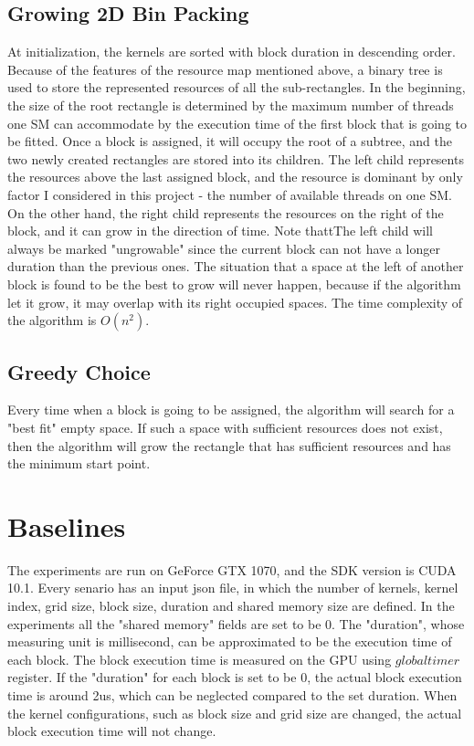\documentclass[12pt,journal,compsoc]{IEEEtran}
\begin{document}
\subsection{Growing 2D Bin Packing}
At initialization, the kernels are sorted with block duration in descending order. Because of the features of the resource map mentioned above, a binary tree is used to store the represented resources of all the sub-rectangles. In the beginning, the size of the root rectangle is determined by the maximum number of threads one SM can accommodate by the execution time of the first block that is going to be fitted. Once a block is assigned, it will occupy the root of a subtree, and the two newly created rectangles are stored into its children. The left child represents the resources above the last assigned block, and the resource is dominant by only factor I considered in this project - the number of available threads on one SM. On the other hand, the right child represents the resources on the right of the block, and it can grow in the direction of time. Note thattThe left child will always be marked "ungrowable" since the current block can not have a longer duration than the previous ones. The situation that a space at the left of another block is found to be the best to grow will never happen, because if the algorithm let it grow, it may overlap with its right occupied spaces. The time complexity of the algorithm is $O(n^2)$.
\subsection{Greedy Choice}
Every time when a block is going to be assigned, the algorithm will search for a "best fit" empty space. If such a space with sufficient resources does not exist, then the algorithm will grow the rectangle that has sufficient resources and has the minimum start point.


\section{Baselines}
The experiments are run on GeForce GTX 1070, and the SDK version is CUDA 10.1. Every senario has an input json file, in which the number of kernels, kernel index, grid size, block size, duration and shared memory size are defined. In the experiments all the "shared memory" fields are set to be 0. The "duration", whose measuring unit is millisecond, can be approximated to be the execution time of each block. The block execution time is measured on the GPU using $globaltimer$ register. If the "duration" for each block is set to be 0, the actual block execution time is around 2us, which can be neglected compared to the set duration. When the kernel configurations, such as block size and grid size are changed, the actual block execution time will not change.
\end{document}
